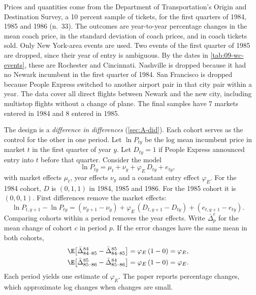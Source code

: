 Prices and quantities come from the Department of Transportation's Origin and Destination Survey, a 10
percent sample of tickets, for the first quarters of 1984, 1985 and 1986 (n.~33). The outcomes are
year-to-year percentage changes in the mean coach price, in the standard deviation of coach prices,
and in coach tickets sold. Only New York-area events are used. Two events of the first quarter of 1985
are dropped, since their year of entry is ambiguous. By the dates in \cref{tab:09-wc-events}, these
are Rochester and Cincinnati. Nashville is dropped because it had no Newark incumbent in the first
quarter of 1984. San Francisco is dropped because People Express switched to another airport pair in
that city pair within a year. The data cover all direct flights between Newark and the new city,
including multistop flights without a change of plane. The final samples have 7 markets entered in
1984 and 8 entered in 1985.

The design is a \emph{difference in differences} (\cref{sec:A-did}). Each cohort serves as the control for the other in
one period. Let $\ln P_{ty}$ be the log mean incumbent price in market $t$ in the first quarter of
year $y$. Let $D_{ty}=1$ if People Express announced entry into $t$ before that quarter. Consider the
model
\begin{equation}\label{eq:09-wc-did-model}
\ln P_{ty}=\mu_t+\nu_y+\varphi_E\,D_{ty}+e_{ty},
\end{equation}
with market effects $\mu_t$, year effects $\nu_y$ and a constant entry effect $\varphi_E$. For the 1984
cohort, $D$ is $(0,1,1)$ in 1984, 1985 and 1986. For the 1985 cohort it is $(0,0,1)$. First
differences remove the market effects:
\begin{equation*}
\ln P_{t,y+1}-\ln P_{ty}=(\nu_{y+1}-\nu_y)+\varphi_E\,(D_{t,y+1}-D_{ty})+(e_{t,y+1}-e_{ty}).
\end{equation*}
Comparing cohorts within a period removes the year effects. Write $\bar\Delta^{c}_{p}$ for the mean
change of cohort $c$ in period $p$. If the error changes have the same mean in both cohorts,
\begin{align*}
\E\big[\bar\Delta^{84}_{84\text{--}85}-\bar\Delta^{85}_{84\text{--}85}\big] &= \varphi_E\,(1-0)=\varphi_E,\\
\E\big[\bar\Delta^{85}_{85\text{--}86}-\bar\Delta^{84}_{85\text{--}86}\big] &= \varphi_E\,(1-0)=\varphi_E .
\end{align*}
Each period yields one estimate of $\varphi_E$. The paper reports percentage changes, which approximate
log changes when changes are small.

